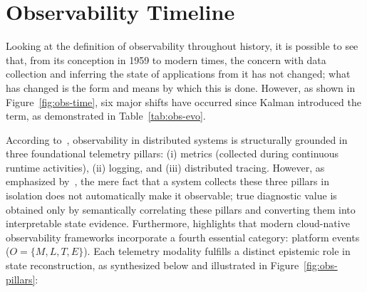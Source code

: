 \section{Observability Timeline}
\label{sec:obs-time}

Looking at the definition of observability throughout history, it is possible to see that, from its conception in 1959 to modern times, the concern with data collection and inferring the state of applications from it has not changed; what has changed is the form and means by which this is done. However, as shown in Figure~\ref{fig:obs-time}, six major shifts have occurred since Kalman introduced the term, as demonstrated in Table~\ref{tab:obs-evo}.





According to~, observability in distributed systems is structurally grounded in three foundational telemetry pillars: (i) metrics (collected during continuous runtime activities), (ii) logging, and (iii) distributed tracing. However, as emphasized by~, the mere fact that a system collects these three pillars in isolation does not automatically make it observable; true diagnostic value is obtained only by semantically correlating these pillars and converting them into interpretable state evidence. Furthermore,  highlights that modern cloud-native observability frameworks incorporate a fourth essential category: platform events ($O = \{M, L, T, E\}$). Each telemetry modality fulfills a distinct epistemic role in state reconstruction, as synthesized below and illustrated in Figure~\ref{fig:obs-pillars}:

